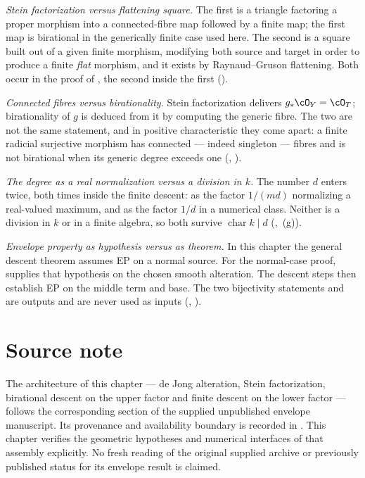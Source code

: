\emph{Stein factorization versus flattening square.}  The first is a
triangle factoring a proper morphism into a connected-fibre map
followed by a finite map; the first map is birational in the generically
finite case used here.  The second is a square
built out of a given finite morphism, modifying both source and target in
order to produce a finite \emph{flat} morphism, and it exists by
Raynaud--Gruson flattening.  Both occur in the proof of
, the second inside the first
().

\emph{Connected fibres versus birationality.}  Stein factorization delivers
$g_*\cO_Y=\cO_T$; birationality of $g$ is deduced from it by computing
the generic fibre.  The two are not the same statement, and in positive
characteristic they come apart: a finite radicial surjective morphism has
connected --- indeed singleton --- fibres and is not birational
when its generic degree exceeds one (,
).

\emph{The degree as a real normalization versus a division in $k$.}  The
number $d$ enters twice, both times inside the finite descent: as the
factor $1/(md)$ normalizing a real-valued maximum, and as the factor
$1/d$ in a numerical class.  Neither is a division in $k$ or in a finite
algebra, so both survive $\operatorname{char}k\mid d$
(, \,(g)).

\emph{Envelope property as hypothesis versus as theorem.}  In this chapter
the general descent theorem assumes EP on a normal source.
For the normal-case proof,  supplies
that hypothesis on the chosen smooth alteration.
The descent steps then establish EP on the middle term and base.  The two bijectivity statements
 and 
are outputs and are never used as inputs
(, ).

\section{Source note}
\label{sec:ch42-source-note}

The architecture of this chapter --- de Jong alteration, Stein
factorization, birational descent on the upper factor and finite descent
on the lower factor --- follows the corresponding section of the supplied
unpublished envelope manuscript.  Its provenance and availability boundary
is recorded in .
This chapter verifies the geometric hypotheses and numerical interfaces
of that assembly explicitly.  No fresh reading of the original supplied
archive or previously published status for its envelope result is claimed.

